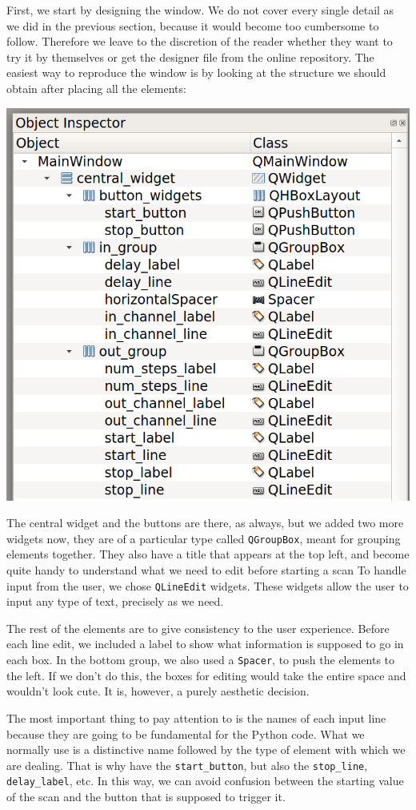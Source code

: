 First, we start by designing the window. We do not cover every single detail as we did in the previous section, because it would become too cumbersome to follow. Therefore we leave to the discretion of the reader whether they want to try it by themselves or get the designer file from the online repository. The easiest way to reproduce the window is by looking at the structure we should obtain after placing all the elements:

\begin{center}
    \includegraphics[width=.5\textwidth]{images/Chapter_09/09_final_window_structure.png}
\end{center}

The central widget and the buttons are there, as always, but we added two more widgets now, they are of a particular type called \texttt{QGroupBox}, meant for grouping elements together. They also have a title that appears at the top left, and become quite handy to understand what we need to edit before starting a scan To handle input from the user, we chose \texttt{QLineEdit} widgets. These widgets allow the user to input any type of text, precisely as we need.

The rest of the elements are to give consistency to the user experience. Before each line edit, we included a label to show what information is supposed to go in each box. In the bottom group, we also used a \texttt{Spacer}, to push the elements to the left. If we don't do this, the boxes for editing would take the entire space and wouldn't look cute. It is, however, a purely aesthetic decision.

The most important thing to pay attention to is the names of each input line because they are going to be fundamental for the Python code. What we normally use is a distinctive name followed by the type of element with which we are dealing. That is why have the \texttt{start\_button}, but also the \texttt{stop\_line}, \texttt{delay\_label}, etc. In this way, we can avoid confusion between the starting value of the scan and the button that is supposed to trigger it.

